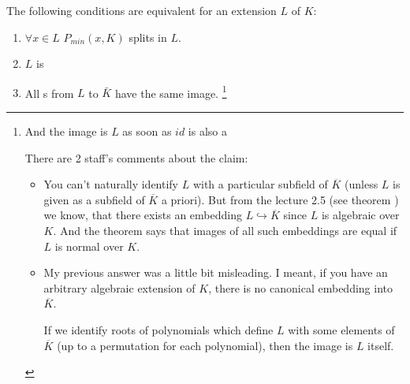 \begin{theorem}
  The following conditions are equivalent for an extension $L$ of $K$:
  \begin{enumerate}
  \item $\forall x \in L$ $P_{min}\left(x, K\right)$ splits in $L$.
  \item $L$ is 
  \item All s from $L$ to $\bar{K}$ have the
    same image.
    \footnote{
      And the image is $L$ as soon as $id$ is also a

      There are 2 staff's comments about the claim:
      \begin{itemize}
      \item You can't naturally identify $L$ with a particular
        subfield of $\overline{K}$ (unless $L$ is given as a
        subfield of $\overline{K}$ a priori). But from the lecture
        2.5 (see theorem ) we know, that there
        exists an embedding $L 
        \hookrightarrow \overline{K}$ since $L$ is algebraic
        over $K$. And the theorem says that images of all such
        embeddings are equal if $L$ is normal over $K$. 
      \item My previous answer was a little bit misleading. I meant,
        if you have an arbitrary algebraic extension of $K$, there
        is no canonical embedding into $\overline{K}$.


        If we
        identify roots of polynomials which define $L$ with some
        elements of $\overline{K}$ (up to a permutation for each
        polynomial), then the image is $L$ itself. 
      \end{itemize}

}
\end{enumerate}
\end{theorem}
